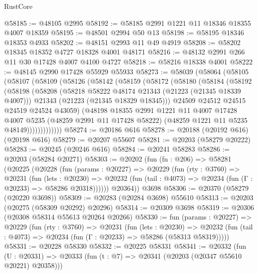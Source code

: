 \begin{lexlean}{RustCore}
\begin{coremodule}
@58185 := @48105 @2995
@58192 := @58185 @2991 @1221 @11 @18346 @18355 @4007 @18359
@58195 := @48501 @2994 @50 @13
@58198 := @58195 @18346 @18353 @4933
@58202 := @48151 @2993 @11 @49 @4919
@58208 := @58202 @18345 @18352 @4727 @18328 @4001 @48171
@58216 := @48132 @2991 @266 @11 @30 @17428 @4007 @4100 @4727
@58218 := @58216 @18338 @4001
@58222 := @48145 @2990 @17428 @55929 @55933
@58273 := @58039
    (@58064
      (@58105
        (@58107
          (@58109
            (@58126
              (@58142
                (@58159
                  (@58172
                    (@58180
                      (@58184
                        (@58192
                          (@58198
                            (@58208
                              (@58218 @58222 @48174 @21343 (@21223 (@21345 @18339 @4007)))
                              @21343
                              (@21223 (@21345 @18329 @18345)))
                            @24509
                            @24512
                            @24515
                            @24519
                            @24524
                            @43059)
                          (@48198
                            @18355
                            @2991
                            @1221
                            @11
                            @4007
                            @17428
                            @4007
                            @5235
                            (@48259 @2991 @11 @17428 @58222)
                            (@48259 @1221 @11 @5235 @48149)))))))))))))
@58274 := @20186 @616
@58278 := @20188 (@20192 @616) (@20198 @616)
@58279 := @20207 @55607
@58281 := @20203 (@58279 @20222)
@58283 := @20245 (@20246 @616)
@58284 := @20241 @58283
@58286 := @20203 (@58284 @20271)
@58303 := @20202
    (fun (fn : @206) =>
    @58281
      (@20225
        (@20228
          (fun (params : @20227) =>
          @20229
            (fun (rty : @3760) =>
            @20231
              (fun (lets : @20230) =>
              @20232 (fun (tail : @4073) => @20234 (fun (Γ : @20233) => @58286 @20318))))))
        @20364))
    @3698
@58306 := @20370 (@58279 (@20220 @3698))
@58309 := @20283 (@20284 @3698) @55610
@58313 := @20203 (@20275 (@58309 @20292) @20296)
@58314 := @20309 @3698
@58319 := @20306 (@20308 @58314 @55613 @20264 @20266)
@58330 := fun (params : @20227) =>
  @20229
    (fun (rty : @3760) =>
    @20231
      (fun (lets : @20230) =>
      @20232 (fun (tail : @4073) => @20234 (fun (Γ : @20233) => @58286 (@58313 @58319)))))
@58331 := @20228 @58330
@58332 := @20225 @58331
@58341 := @20332
    (fun (U : @20331) => @20333 (fun (t : @7) => @20341 (@20203 (@20347 @55610 @20221) @20358)))

\end{coremodule}
\end{lexlean}
